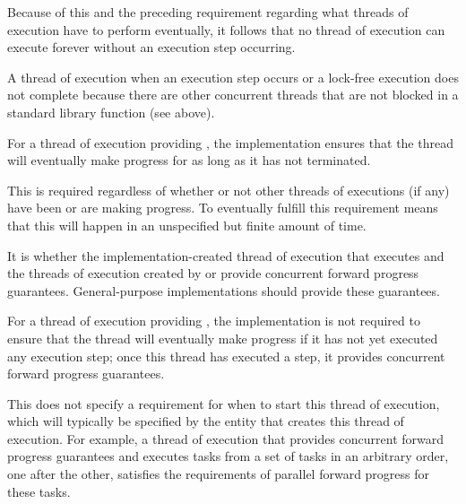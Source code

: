 \pnum
\begin{note}
Because of this and the preceding requirement regarding what threads of execution
have to perform eventually, it follows that no thread of execution can execute
forever without an execution step occurring.
\end{note}

\pnum
A thread of execution 
when an execution step occurs or a
lock-free execution does not complete because there are other concurrent threads
that are not blocked in a standard library function (see above).

\pnum
{}%
For a thread of execution providing ,
the implementation ensures that the thread will eventually make progress for as
long as it has not terminated.
\begin{note}
This is required regardless of whether or not other threads of executions (if any)
have been or are making progress. To eventually fulfill this requirement means that
this will happen in an unspecified but finite amount of time.
\end{note}

\pnum
It is  whether the
implementation-created thread of execution that executes
 and the threads of execution created by
or 
provide concurrent forward progress guarantees.
General-purpose implementations should provide these guarantees.

\pnum
{}%
For a thread of execution providing ,
the implementation is not required to ensure that the thread will eventually make
progress if it has not yet executed any execution step; once this thread has
executed a step, it provides concurrent forward progress guarantees.

\pnum
\begin{note}
This does not specify a requirement for when to start this thread of execution,
which will typically be specified by the entity that creates this thread of
execution. For example, a thread of execution that provides concurrent forward
progress guarantees and executes tasks from a set of tasks in an arbitrary order,
one after the other, satisfies the requirements of parallel forward progress for
these tasks.
\end{note}

